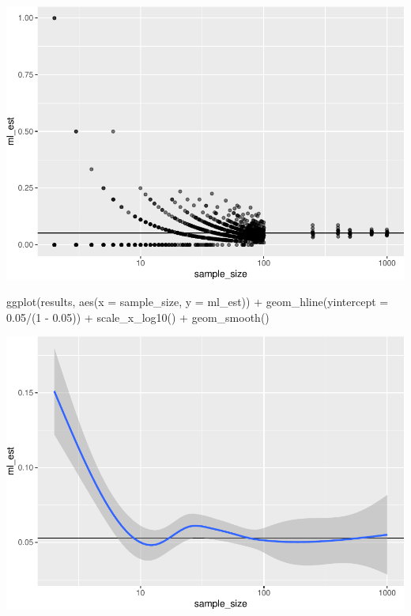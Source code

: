 \documentclass[
]{book}
\newenvironment{Shaded}{\begin{snugshade}}{\end{snugshade}}
\newcommand{\AttributeTok}[1]{\textcolor[rgb]{0.77,0.63,0.00}{#1}}
\newcommand{\DecValTok}[1]{\textcolor[rgb]{0.00,0.00,0.81}{#1}}
\newcommand{\FloatTok}[1]{\textcolor[rgb]{0.00,0.00,0.81}{#1}}
\newcommand{\FunctionTok}[1]{\textcolor[rgb]{0.00,0.00,0.00}{#1}}
\newcommand{\NormalTok}[1]{#1}
\newcommand{\SpecialCharTok}[1]{\textcolor[rgb]{0.00,0.00,0.00}{#1}}
\begin{document}
\includegraphics{01-04-bias-and-consistency_files/figure-latex/unnamed-chunk-8-1.pdf}

\begin{Shaded}
\begin{Highlighting}[]
\FunctionTok{ggplot}\NormalTok{(results, }\FunctionTok{aes}\NormalTok{(}\AttributeTok{x =}\NormalTok{ sample\_size, }\AttributeTok{y =}\NormalTok{ ml\_est)) }\SpecialCharTok{+} 
  \FunctionTok{geom\_hline}\NormalTok{(}\AttributeTok{yintercept =} \FloatTok{0.05}\SpecialCharTok{/}\NormalTok{(}\DecValTok{1} \SpecialCharTok{{-}} \FloatTok{0.05}\NormalTok{)) }\SpecialCharTok{+} 
  \FunctionTok{scale\_x\_log10}\NormalTok{() }\SpecialCharTok{+} 
  \FunctionTok{geom\_smooth}\NormalTok{()}
\end{Highlighting}
\end{Shaded}

\includegraphics{01-04-bias-and-consistency_files/figure-latex/unnamed-chunk-8-2.pdf}
\end{document}
